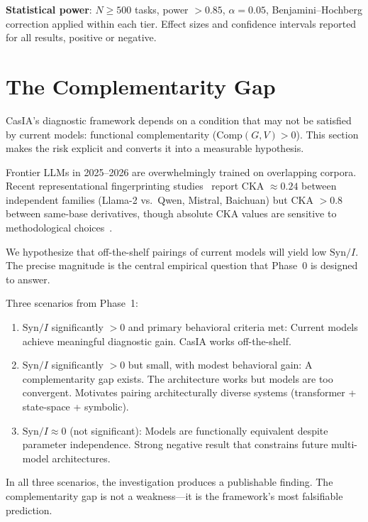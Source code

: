 \documentclass[11pt,a4paper]{article}
\theoremstyle{definition}
\begin{document}
\textbf{Statistical power}: $N \geq 500$ tasks, power $> 0.85$, $\alpha = 0.05$, Benjamini--Hochberg correction applied within each tier. Effect sizes and confidence intervals reported for all results, positive or negative.


\section{The Complementarity Gap}
\label{sec:compgap}

CasIA's diagnostic framework depends on a condition that may not be satisfied by current models: functional complementarity ($\mathrm{Comp}(G,V) > 0$). This section makes the risk explicit and converts it into a measurable hypothesis.

Frontier LLMs in 2025--2026 are overwhelmingly trained on overlapping corpora. Recent representational fingerprinting studies~\cite{zhang2025reef} report CKA $\approx 0.24$ between independent families (Llama-2 vs.\ Qwen, Mistral, Baichuan) but CKA $> 0.8$ between same-base derivatives, though absolute CKA values are sensitive to methodological choices~\cite{davari2022cka}.

We hypothesize that off-the-shelf pairings of current models will yield low $\mathrm{Syn}/I$. The precise magnitude is the central empirical question that Phase~0 is designed to answer.

Three scenarios from Phase~1:
\begin{enumerate}[leftmargin=*,itemsep=3pt]
\item $\mathrm{Syn}/I$ significantly $> 0$ and primary behavioral criteria met: Current models achieve meaningful diagnostic gain. CasIA works off-the-shelf.
\item $\mathrm{Syn}/I$ significantly $> 0$ but small, with modest behavioral gain: A complementarity gap exists. The architecture works but models are too convergent. Motivates pairing architecturally diverse systems (transformer + state-space + symbolic).
\item $\mathrm{Syn}/I \approx 0$ (not significant): Models are functionally equivalent despite parameter independence. Strong negative result that constrains future multi-model architectures.
\end{enumerate}

In all three scenarios, the investigation produces a publishable finding. The complementarity gap is not a weakness---it is the framework's most falsifiable prediction.
\end{document}
